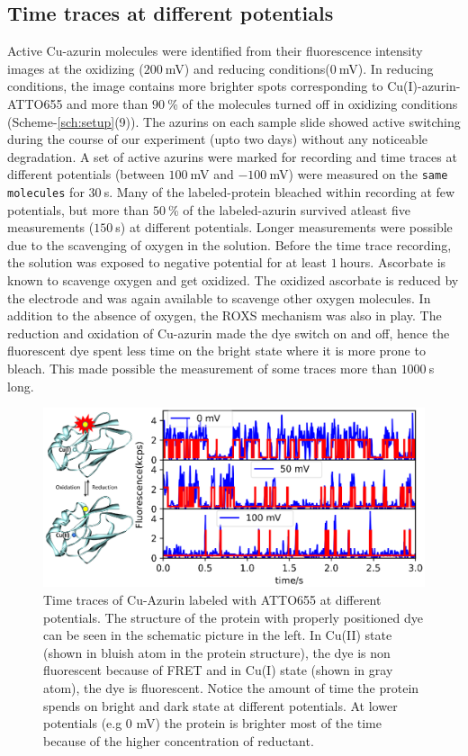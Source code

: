 \documentclass[journal=jacsat,manuscript=article]{achemso}
\begin{document}
\subsection{Time traces at different potentials}
Active Cu-azurin molecules were identified from their fluorescence intensity images at the oxidizing ($200~$mV) and reducing conditions($0~$mV). In reducing conditions, the image contains more brighter spots corresponding to Cu(I)-azurin-ATTO655 and more than $90~$\% of the molecules turned off in oxidizing conditions (Scheme-\ref{sch:setup}(9)). The azurins on each sample slide showed active switching during the course of our experiment (upto two days) without any noticeable degradation. A set of active azurins were marked for recording and time traces at different potentials (between $100~$mV and $-100~$mV) were measured on the \texttt{same molecules} for $30~$s. Many of the labeled-protein bleached within recording at few potentials, but more than $50~$\% of the labeled-azurin survived atleast five measurements ($150~$s) at different potentials. Longer measurements were possible due to the scavenging of oxygen in the solution. Before the time trace recording, the solution was exposed to negative potential for at least $1~$hours. Ascorbate is known to  scavenge oxygen\cite{dave1997effectiveness} and get oxidized. The oxidized ascorbate is reduced by the electrode and was again available to scavenge other oxygen molecules. In addition to the absence of oxygen, the ROXS mechanism was also in play. The reduction and oxidation of Cu-azurin made the dye switch on and off, hence the fluorescent dye spent less time on the bright state where it is more prone to bleach. This made possible the measurement of some traces more than $1000~$s long.\\
\begin{figure}
	\centering
	\includegraphics[]{Figure_1_timetrace_CuAzu.eps}
	\caption{Time traces of Cu-Azurin labeled with ATTO655 at different potentials. The structure of the protein with properly positioned dye can be seen in the schematic picture in the left. In Cu(II) state (shown in bluish atom in the protein structure), the dye is non fluorescent because of FRET and in Cu(I) state (shown in gray atom), the dye is fluorescent. Notice the amount of time the protein spends on bright and dark state at different potentials. At lower potentials (e.g 0 mV) the protein is brighter most of the time because of the higher concentration of reductant.}
	\label{fig:timetrace}
\end{figure}
\end{document}
